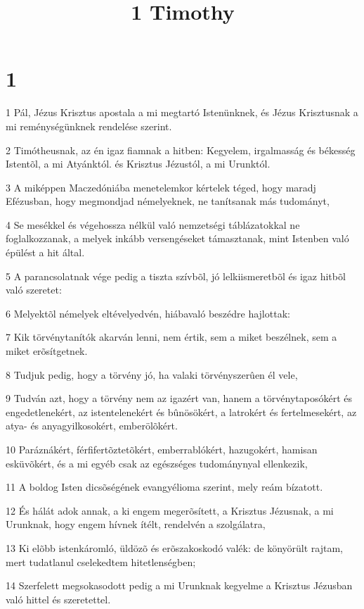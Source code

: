 

\title{1 Timothy}


\chapter{1}

\par 1 Pál, Jézus Krisztus apostala a mi megtartó Istenünknek, és Jézus Krisztusnak a mi reménységünknek rendelése szerint.
\par 2 Timótheusnak, az én igaz fiamnak a hitben: Kegyelem, irgalmasság és békesség Istentõl, a mi Atyánktól. és Krisztus Jézustól, a mi Urunktól.
\par 3 A miképpen Maczedóniába menetelemkor kértelek téged, hogy maradj Efézusban, hogy megmondjad némelyeknek, ne tanítsanak más tudományt,
\par 4 Se mesékkel és végehossza nélkül való nemzetségi táblázatokkal ne foglalkozzanak, a melyek inkább versengéseket támasztanak,  mint Istenben való épülést a hit által.
\par 5 A parancsolatnak vége pedig a tiszta szívbõl, jó lelkiismeretbõl és igaz hitbõl való szeretet:
\par 6 Melyektõl némelyek eltévelyedvén, hiábavaló beszédre hajlottak:
\par 7 Kik törvénytanítók akarván lenni, nem értik, sem a miket beszélnek, sem a miket erõsítgetnek.
\par 8 Tudjuk pedig, hogy a törvény jó, ha valaki törvényszerûen él vele,
\par 9 Tudván azt, hogy a törvény nem az igazért van, hanem a törvénytaposókért és engedetlenekért, az istentelenekért és bûnösökért, a latrokért és fertelmesekért, az atya- és anyagyilkosokért, emberölõkért.
\par 10 Paráznákért, férfifertõztetõkért, emberrablókért, hazugokért, hamisan esküvõkért, és a mi egyéb csak az egészséges tudománynyal ellenkezik,
\par 11 A boldog Isten dicsõségének evangyélioma szerint, mely reám bízatott.
\par 12 És hálát adok annak, a ki engem megerõsített, a Krisztus Jézusnak, a mi Urunknak, hogy engem hívnek ítélt, rendelvén a szolgálatra,
\par 13 Ki elõbb istenkáromló, üldözõ és erõszakoskodó valék: de könyörült rajtam, mert tudatlanul cselekedtem hitetlenségben;
\par 14 Szerfelett megsokasodott pedig a mi Urunknak kegyelme a Krisztus Jézusban való hittel és szeretettel.
